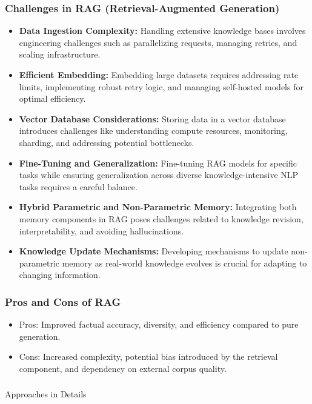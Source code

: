 \begin{frame}[fragile]\frametitle{Challenges in RAG (Retrieval-Augmented Generation)}
  \begin{itemize}
    \item \textbf{Data Ingestion Complexity:} Handling extensive knowledge bases involves engineering challenges such as parallelizing requests, managing retries, and scaling infrastructure.
    \item \textbf{Efficient Embedding:} Embedding large datasets requires addressing rate limits, implementing robust retry logic, and managing self-hosted models for optimal efficiency.
    \item \textbf{Vector Database Considerations:} Storing data in a vector database introduces challenges like understanding compute resources, monitoring, sharding, and addressing potential bottlenecks.
    \item \textbf{Fine-Tuning and Generalization:} Fine-tuning RAG models for specific tasks while ensuring generalization across diverse knowledge-intensive NLP tasks requires a careful balance.
    \item \textbf{Hybrid Parametric and Non-Parametric Memory:} Integrating both memory components in RAG poses challenges related to knowledge revision, interpretability, and avoiding hallucinations.
    \item \textbf{Knowledge Update Mechanisms:} Developing mechanisms to update non-parametric memory as real-world knowledge evolves is crucial for adapting to changing information.
  \end{itemize}
\end{frame}

\begin{frame}[fragile]\frametitle{Pros and Cons of RAG}

\begin{itemize}
\item Pros: Improved factual accuracy, diversity, and efficiency compared to pure generation.
\item Cons: Increased complexity, potential bias introduced by the retrieval component, and dependency on external corpus quality.
\end{itemize}	

\end{frame}

\begin{frame}[fragile]\frametitle{}
\begin{center}
{\Large Approaches in Details}
\end{center}
\end{frame}

